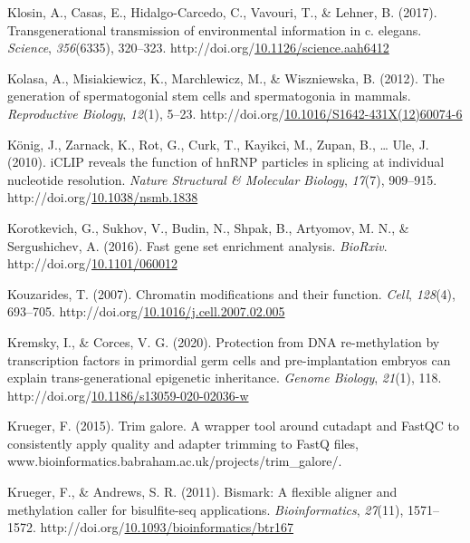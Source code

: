 \documentclass[12pt,twoside]{reedthesis}
\newlength{\cslhangindent}
\newenvironment{CSLReferences}[2] %
 {%
  \setlength{\parindent}{0pt}
  \ifodd #1 \everypar{\setlength{\hangindent}{\cslhangindent}}\ignorespaces\fi
  \ifnum #2 > 0
  \setlength{\parskip}{#2\baselineskip}
  \fi
 }%
 {}
\begin{document}
\begin{CSLReferences}{1}{0}
\leavevmode{}%
Klosin, A., Casas, E., Hidalgo-Carcedo, C., Vavouri, T., \& Lehner, B. (2017). Transgenerational transmission of environmental information in c. elegans. \emph{Science}, \emph{356}(6335), 320--323. http://doi.org/\href{https://doi.org/10.1126/science.aah6412}{10.1126/science.aah6412}

\leavevmode{}%
Kolasa, A., Misiakiewicz, K., Marchlewicz, M., \& Wiszniewska, B. (2012). The generation of spermatogonial stem cells and spermatogonia in mammals. \emph{Reproductive Biology}, \emph{12}(1), 5--23. http://doi.org/\href{https://doi.org/10.1016/S1642-431X(12)60074-6}{10.1016/S1642-431X(12)60074-6}

\leavevmode{}%
König, J., Zarnack, K., Rot, G., Curk, T., Kayikci, M., Zupan, B., \ldots{} Ule, J. (2010). iCLIP reveals the function of hnRNP particles in splicing at individual nucleotide resolution. \emph{Nature Structural \& Molecular Biology}, \emph{17}(7), 909--915. http://doi.org/\href{https://doi.org/10.1038/nsmb.1838}{10.1038/nsmb.1838}

\leavevmode{}%
Korotkevich, G., Sukhov, V., Budin, N., Shpak, B., Artyomov, M. N., \& Sergushichev, A. (2016). Fast gene set enrichment analysis. \emph{BioRxiv}. http://doi.org/\href{https://doi.org/10.1101/060012}{10.1101/060012}

\leavevmode{}%
Kouzarides, T. (2007). Chromatin modifications and their function. \emph{Cell}, \emph{128}(4), 693--705. http://doi.org/\href{https://doi.org/10.1016/j.cell.2007.02.005}{10.1016/j.cell.2007.02.005}

\leavevmode{}%
Kremsky, I., \& Corces, V. G. (2020). Protection from DNA re-methylation by transcription factors in primordial germ cells and pre-implantation embryos can explain trans-generational epigenetic inheritance. \emph{Genome Biology}, \emph{21}(1), 118. http://doi.org/\href{https://doi.org/10.1186/s13059-020-02036-w}{10.1186/s13059-020-02036-w}

\leavevmode{}%
Krueger, F. (2015). Trim galore. A wrapper tool around cutadapt and FastQC to consistently apply quality and adapter trimming to FastQ files, www.bioinformatics.babraham.ac.uk/projects/trim{\_}galore/.

\leavevmode{}%
Krueger, F., \& Andrews, S. R. (2011). Bismark: A flexible aligner and methylation caller for bisulfite-seq applications. \emph{Bioinformatics}, \emph{27}(11), 1571--1572. http://doi.org/\href{https://doi.org/10.1093/bioinformatics/btr167}{10.1093/bioinformatics/btr167}


\end{CSLReferences}
\end{document}
